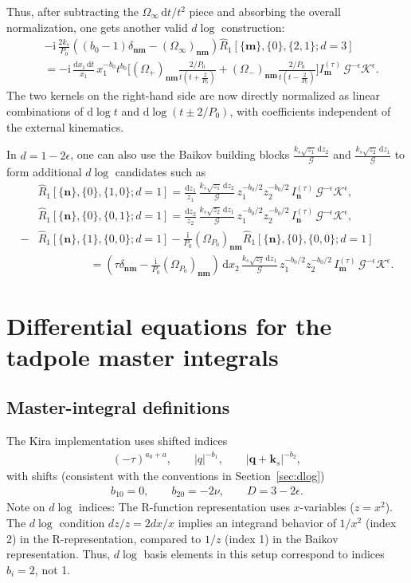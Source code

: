 \documentclass[a4paper,12pt]{article}
\newcommand{\n}{\nonumber}
\def\di{{\mathrm{d}}}
\def\ii{\mathrm{i}}
\def\ep{\epsilon}
\newcommand{\mG}{\mathcal{G}}
\newcommand{\mK}{\mathcal{K}}
\begin{document}
Thus, after subtracting the $\Omega_\infty\,\di t/t^2$ piece and absorbing the overall normalization, one gets another valid $d\log$ construction:
\begin{align}
	&-\ii\,\frac{2k_s}{P_0}\left(
	(b_0-1)\delta_{\bm n\bm m}
	-(\Omega_\infty)_{\bm n\bm m}
	\right)\hat{R}_1[\{\bm m\},\{0\},\{2,1\};d=3] \n\\
	&= -\ii\,\frac{\di x_1\,\di t}{x_1}\,x_1^{-b_0}t^{b_0}
	\Bigg[
	(\Omega_+)_{\bm n\bm m}\frac{2/P_0}{t\left(t+\frac{2}{P_0}\right)}  
	+(\Omega_-)_{\bm n\bm m}\frac{2/P_0}{t\left(t-\frac{2}{P_0}\right)}
	\Bigg]
	I^{(\tau)}_{\bm m}\,\mG^{-\ep}\mK^{\ep}.
\end{align}
The two kernels on the right-hand side are now directly normalized
as linear combinations of $\di\log t$ and $\di\log(t\pm 2/P_0)$,
with coefficients independent of the external kinematics.

In $d=1-2\ep$, one can also use the Baikov building blocks
$\frac{k_s\sqrt{z_1}\,\di z_2}{\mG}$ and $\frac{k_s\sqrt{z_2}\,\di z_1}{\mG}$ to form additional $d\log$ candidates such as
\begin{align}
	&\hat{R}_1[\{\bm n\},\{0\},\{1,0\};d=1]
	= \frac{\di z_1}{z_1}\,\frac{k_s\sqrt{z_1}\,\di z_2}{\mG}\,
	z_1^{-b_0/2}z_2^{-b_0/2}\,I^{(\tau)}_{\bm n}\,\mG^{-\ep}\mK^{\ep}, \n \\
	&\hat{R}_1[\{\bm n\},\{0\},\{0,1\};d=1]
	= \frac{\di z_2}{z_2}\,\frac{k_s\sqrt{z_2}\,\di z_1}{\mG}\,
	z_1^{-b_0/2}z_2^{-b_0/2}\,I^{(\tau)}_{\bm n}\,\mG^{-\ep}\mK^{\ep},  \n \\
	-&\hat{R}_1[\{\bm{n}\},\{1\},\{0,0\};d=1]-  \frac{\ii}{P_0} (\Omega_{P_0})_{\bm n\bm m} \hat{R}_1[\{\bm{n}\},\{0\},\{0,0\};d=1]   \n\\                       &~~~~~~~~~~~~~~~~~~~~~= \left(\tau\delta_{\bm n\bm m} - 	 \frac{\ii}{P_0}(\Omega_{P_0})_{\bm n\bm m}\right)\,\di x_2\,\frac{k_s\sqrt{z_2}\,\di z_1}{\mG}\,
	z_1^{-b_0/2}z_2^{-b_0/2}\,I^{(\tau)}_{\bm m}\,\mG^{-\ep}\mK^{\ep}.
\end{align}


\section{Differential equations for the tadpole master integrals}
\label{sec:deR1}
\subsection{Master-integral definitions}
The Kira implementation uses shifted indices
\begin{align}
	(-\tau)^{a_0+a},\qquad |q|^{-b_1},\qquad |\bm q+\bm k_s|^{-b_2},
\end{align}
with shifts (consistent with the conventions in Section~\ref{sec:dlog})
\begin{align}
	b_{10}=0,\qquad b_{20}=-2\nu,\qquad D=3-2\ep.
\end{align}
Note on $d\log$ indices: The R-function representation uses $x$-variables ($z=x^2$). The $d\log$ condition $dz/z = 2 dx/x$ implies an integrand behavior of $1/x^2$ (index 2) in the R-representation, compared to $1/z$ (index 1) in the Baikov representation. Thus, $d\log$ basis elements in this setup correspond to indices $b_i=2$, not 1.
\end{document}
